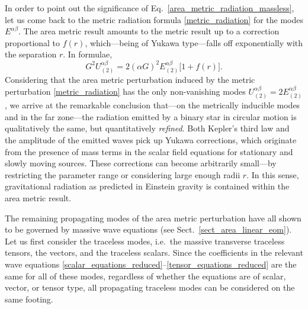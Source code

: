 In order to point out the significance of Eq.~\eqref{area_metric_radiation_massless}, let us come back to the metric radiation formula \eqref{metric_radiation} for the modes $E^{\alpha\beta}$. The area metric result amounts to the metric result up to a correction proportional to $f(r)$, which---being of Yukawa type---falls off exponentially with the separation $r$. In formulae,
\begin{equation}
  G^2 U^{\alpha\beta}_{(2)} = 2 (\alpha G)^2 E^{\alpha\beta}_{(2)}\lbrack 1 + f(r)\rbrack.
\end{equation}
Considering that the area metric perturbation induced by the metric perturbation \eqref{metric_radiation} has the only non-vanishing modes $U_{(2)}^{\alpha\beta} = 2 E_{(2)}^{\alpha\beta}$, we arrive at the remarkable conclusion that---on the metrically inducible modes and in the far zone---the radiation emitted by a binary star in circular motion is qualitatively the same, but quantitatively \emph{refined}. Both Kepler's third law and the amplitude of the emitted waves pick up Yukawa corrections, which originate from the presence of mass terms in the scalar field equations for stationary and slowly moving sources. These corrections can become arbitrarily small---by restricting the parameter range or considering large enough radii $r$. In this sense, gravitational radiation as predicted in Einstein gravity is contained within the area metric result.

The remaining propagating modes of the area metric perturbation have all shown to be governed by massive wave equations (see Sect.~\ref{sect_area_linear_eom}). Let us first consider the traceless modes, i.e.~the massive transverse traceless tensors, the vectors, and the traceless scalars. Since the coefficients in the relevant wave equations \eqref{scalar_equations_reduced}--\eqref{tensor_equations_reduced} are the same for all of these modes, regardless of whether the equations are of scalar, vector, or tensor type, all propagating traceless modes can be considered on the same footing.

